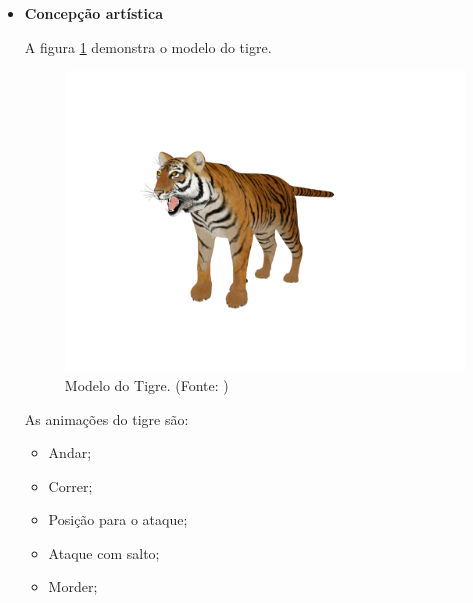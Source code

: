 \begin{itemize}
\item {\bf Concepção artística}

A figura \ref{img:tigre} demonstra o modelo do tigre.
\newpage
\begin{figure}[H]
 \centering
 \includegraphics[scale=0.3]{Imagens/tigre01.png}
 \caption{Modelo do Tigre. (Fonte: \cite{bib:tigre01})}
\label{img:tigre}
\end{figure}

As animações do tigre são:
\begin{itemize}
\item {Andar;}
\item {Correr;}
\item {Posição para o ataque;}
\item {Ataque com salto;}
\item {Morder;}
\end{itemize}
\end{itemize}

